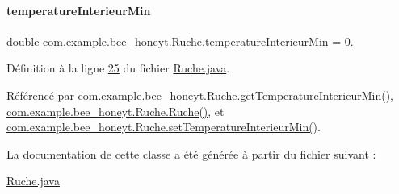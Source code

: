 \mbox{\label{classcom_1_1example_1_1bee__honeyt_1_1_ruche_a143b0b293ab3aaa67a86550efeb56f07}} 
\paragraph{\texorpdfstring{temperature\+Interieur\+Min}{temperatureInterieurMin}}
{\footnotesize\ttfamily double com.\+example.\+bee\+\_\+honeyt.\+Ruche.\+temperature\+Interieur\+Min = 0.\hspace{0.3cm}{\ttfamily [private]}}



Définition à la ligne \hyperlink{_ruche_8java_source_l00025}{25} du fichier \hyperlink{_ruche_8java_source}{Ruche.\+java}.



Référencé par \hyperlink{_ruche_8java_source_l00129}{com.\+example.\+bee\+\_\+honeyt.\+Ruche.\+get\+Temperature\+Interieur\+Min()}, \hyperlink{_ruche_8java_source_l00044}{com.\+example.\+bee\+\_\+honeyt.\+Ruche.\+Ruche()}, et \hyperlink{_ruche_8java_source_l00134}{com.\+example.\+bee\+\_\+honeyt.\+Ruche.\+set\+Temperature\+Interieur\+Min()}.



La documentation de cette classe a été générée à partir du fichier suivant \+:\begin{DoxyCompactItemize}
\item 
\hyperlink{_ruche_8java}{Ruche.\+java}\end{DoxyCompactItemize}
